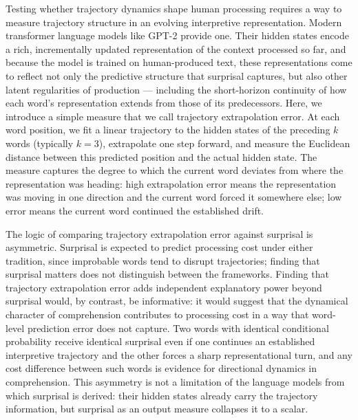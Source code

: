 \documentclass[12pt]{article}
\begin{document}
Testing whether trajectory dynamics shape human processing requires a way to measure trajectory structure in an evolving interpretive representation. Modern transformer language models like GPT-2 \citep{radford2019} provide one. Their hidden states encode a rich, incrementally updated representation of the context processed so far, and because the model is trained on human-produced text, these representations come to reflect not only the predictive structure that surprisal captures, but also other latent regularities of production --- including the short-horizon continuity of how each word's representation extends from those of its predecessors. Here, we introduce a simple measure that we call trajectory extrapolation error. At each word position, we fit a linear trajectory to the hidden states of the preceding $k$ words (typically $k = 3$), extrapolate one step forward, and measure the Euclidean distance between this predicted position and the actual hidden state. The measure captures the degree to which the current word deviates from where the representation was heading: high extrapolation error means the representation was moving in one direction and the current word forced it somewhere else; low error means the current word continued the established drift.

The logic of comparing trajectory extrapolation error against surprisal is asymmetric. Surprisal is expected to predict processing cost under either tradition, since improbable words tend to disrupt trajectories; finding that surprisal matters does not distinguish between the frameworks. Finding that trajectory extrapolation error adds independent explanatory power beyond surprisal would, by contrast, be informative: it would suggest that the dynamical character of comprehension contributes to processing cost in a way that word-level prediction error does not capture. Two words with identical conditional probability receive identical surprisal even if one continues an established interpretive trajectory and the other forces a sharp representational turn, and any cost difference between such words is evidence for directional dynamics in comprehension. This asymmetry is not a limitation of the language models from which surprisal is derived: their hidden states already carry the trajectory information, but surprisal as an output measure collapses it to a scalar.
\end{document}

